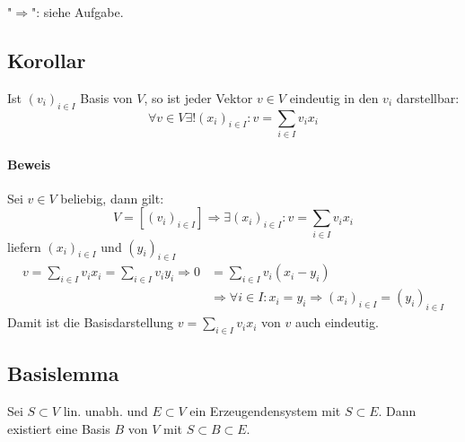  		"$\Rightarrow$": siehe Aufgabe.

 \subsection{Korollar}
 	\begin{Korollar}
 		Ist $(v_i)_{i\in I}$ Basis von $ V $, so ist jeder Vektor $v\in V$ eindeutig in den $v_i$ darstellbar:
 		\[
 			\forall v\in V \exists! (x_i)_{i\in I}: v = \sum_{i\in I} v_ix_i
 		\]
 	\end{Korollar}

 	\paragraph{Beweis}
 		Sei $v\in V$ beliebig, dann gilt:
 		\[
 			V = [(v_i)_{i\in I}] \Rightarrow \exists (x_i)_{i\in I}: v = \sum_{i\in I} v_ix_i
 		\]
 		liefern $(x_i)_{i\in I}$ und $(y_i)_{i\in I}$
 		\begin{align*}
 			v = \sum_{i\in I} v_ix_i = \sum_{i\in I}v_iy_i \Rightarrow 0 & = \sum_{i\in I} v_i(x_i-y_i)                                                      \\
 			                                                             & \Rightarrow \forall i\in I: x_i = y_i \Rightarrow (x_i)_{i\in I} = (y_i)_{i\in I}
 		\end{align*}
 		Damit ist die Basisdarstellung $v = \sum_{i\in I} v_ix_i$ von $v$ auch eindeutig.

 \subsection{Basislemma}
 	\begin{Lemma}[Basislemma]
 		Sei $S\subset V$ lin. unabh. und $E\subset V$ ein Erzeugendensystem mit $S\subset E$. Dann existiert eine Basis $B$ von $V$ mit $S\subset B\subset E$.
 	\end{Lemma}

